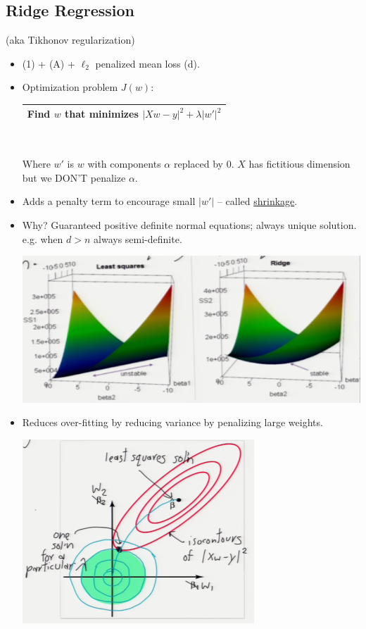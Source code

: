 \documentclass[10pt]{article}
\begin{document}
	\subsection*{Ridge Regression} (aka Tikhonov regularization)
	\
	\begin{itemize}
		\item (1) + (A) + $\ell_{2}$ penalized mean loss (d).
		\item Optimization problem $J(w)$:
		\begin{center}
			\begin{tabular}{|c|}
				\hline
				Find $w$ that minimizes
				$|Xw - y|^{2} + \lambda|w'|^{2}$\\
				\hline
			\end{tabular}\\
		\end{center}
		Where $w'$ is $w$ with components $\alpha$ replaced by 0. $X$ has fictitious dimension but we DON'T penalize $\alpha$.
		\item Adds a penalty term to encourage small $|w'|$ -- called \underline{shrinkage}.
		\item Why? Guaranteed positive definite normal equations; always unique solution. e.g. when $d>n$ always semi-definite.
			\begin{center}
				\includegraphics[scale=0.5]{images/ridge}
			\end{center}
		\item Reduces over-fitting by reducing variance by penalizing large weights.
			\begin{center}
				\includegraphics[scale=0.5]{images/sqrsvslambda}

\end{center}
\end{itemize}
\end{document}
